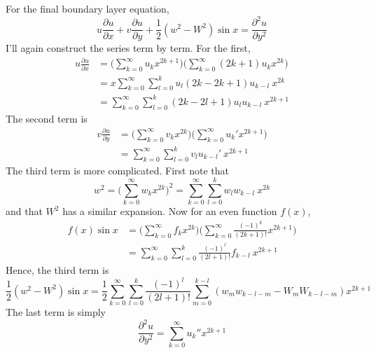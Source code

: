 \documentclass[10pt,a4paper]{report}
\begin{document}
For the final boundary layer equation,
\begin{equation}\label{layer3}
u \frac{\partial u}{\partial x} + v \frac{\partial u}{\partial y} + \frac{1}{2} \left(w^2 - W^2\right) \sin x = \frac{\partial^2 u}{\partial y^2}
\end{equation}
I'll again construct the series term by term. For the first,
\begin{equation*}
\begin{split}
u \frac{\partial u}{\partial x} & = \Bigg( \sum_{k=0}^\infty u_k x^{2k+1} \Bigg) \Bigg( \sum_{k=0}^\infty (2k+1) u_k x^{2k} \Bigg) \\
& = x \sum_{k=0}^\infty \sum_{l=0}^k u_l (2k-2k+1) u_{k-l} \ x^{2k} \\
& = \sum_{k=0}^\infty \sum_{l=0}^k (2k-2l+1) u_l u_{k-l} \ x^{2k+1}
\end{split}
\end{equation*}
The second term is
\begin{equation*}
\begin{split}
v \frac{\partial u}{\partial y} & = \Bigg( \sum_{k=0}^\infty v_k x^{2k} \Bigg) \Bigg( \sum_{k=0}^\infty u_k' x^{2k+1} \Bigg) \\
& = \sum_{k=0}^\infty \sum_{l=0}^k v_l u_{k-l}' \ x^{2k+1}
\end{split}
\end{equation*}
The third term is more complicated. First note that
\begin{equation*}
w^2 = \Bigg(\sum_{k=0}^\infty w_k x^{2k} \Bigg)^2 = \sum_{k=0}^\infty \sum_{l=0}^k w_l w_{k-l} \ x^{2k}
\end{equation*}
and that $W^2$ has a similar expansion. Now for an even function $f(x)$,
\begin{equation*}
\begin{split}
f(x) \sin x & = \Bigg( \sum_{k=0}^\infty f_k x^{2k} \Bigg) \Bigg( \sum_{k=0}^\infty \frac{(-1)^k}{(2k+1)!} x^{2k+1} \Bigg) \\
& = \sum_{k=0}^\infty \sum_{l=0}^k \frac{(-1)^l}{(2l+1)!} f_{k-l} \ x^{2k+1}
\end{split}
\end{equation*}
Hence, the third term is
\begin{equation*}
\frac{1}{2} \left(w^2 - W^2\right) \sin x = \frac{1}{2} \sum_{k=0}^\infty \sum_{l=0}^k \frac{(-1)^l}{(2l+1)!} \sum_{m=0}^{k-l} \left(w_m w_{k-l-m} - W_m W_{k-l-m}\right) x^{2k+1}
\end{equation*}
The last term is simply
\begin{equation*}
\frac{\partial^2 u}{\partial y^2} = \sum_{k=0}^\infty u_k'' x^{2k+1}
\end{equation*}
\end{document}

